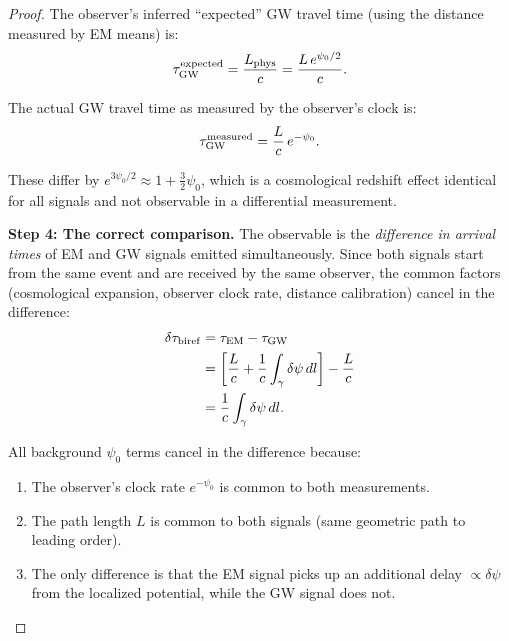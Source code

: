 \documentclass[11pt]{article}
\begin{document}
\begin{proof}
The observer's inferred ``expected'' GW travel time (using the distance
measured by EM means) is:
\begin{equation}
\tau_{\rm GW}^{\rm expected} = \frac{L_{\rm phys}}{c}
= \frac{L\,e^{\psi_0/2}}{c}.
\end{equation}

The actual GW travel time as measured by the observer's clock is:
\begin{equation}
\tau_{\rm GW}^{\rm measured} = \frac{L}{c}\,e^{-\psi_0}.
\end{equation}

These differ by $e^{3\psi_0/2} \approx 1 + \frac{3}{2}\psi_0$,
which is a cosmological redshift effect identical for all signals
and not observable in a differential measurement.

\textbf{Step 4: The correct comparison.}
The observable is the \emph{difference in arrival times} of EM and GW
signals emitted simultaneously. Since both signals start from the
same event and are received by the same observer, the common factors
(cosmological expansion, observer clock rate, distance calibration)
cancel in the difference:
\begin{align}
\delta\tau_{\rm biref} &= \tau_{\rm EM} - \tau_{\rm GW} \nonumber\\
&= \left[\frac{L}{c} + \frac{1}{c}\int_\gamma \delta\psi\,dl\right]
- \frac{L}{c} \nonumber\\
&= \frac{1}{c}\int_\gamma \delta\psi\,dl.
\end{align}

All background $\psi_0$ terms cancel in the difference because:
\begin{enumerate}[nosep]
\item The observer's clock rate $e^{-\psi_0}$ is common to both
  measurements.
\item The path length $L$ is common to both signals (same geometric
  path to leading order).
\item The only difference is that the EM signal picks up an additional
  delay $\propto \delta\psi$ from the localized potential, while the
  GW signal does not.
\end{enumerate}
\end{proof}
\end{document}

